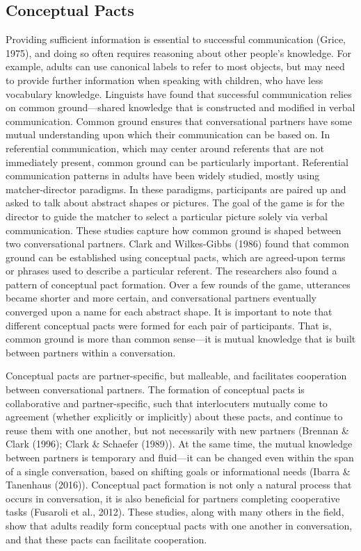 \documentclass[10pt, letterpaper]{article}
\begin{document}
\hypertarget{conceptual-pacts}{%
\subsection{Conceptual Pacts}\label{conceptual-pacts}}

Providing sufficient information is essential to successful
communication (Grice, 1975), and doing so often requires reasoning about
other people's knowledge. For example, adults can use canonical labels
to refer to most objects, but may need to provide further information
when speaking with children, who have less vocabulary knowledge.
Linguists have found that successful communication relies on common
ground---shared knowledge that is constructed and modified in verbal
communication. Common ground ensures that conversational partners have
some mutual understanding upon which their communication can be based
on. In referential communication, which may center around referents that
are not immediately present, common ground can be particularly
important. Referential communication patterns in adults have been widely
studied, mostly using matcher-director paradigms. In these paradigms,
participants are paired up and asked to talk about abstract shapes or
pictures. The goal of the game is for the director to guide the matcher
to select a particular picture solely via verbal communication. These
studies capture how common ground is shaped between two conversational
partners. Clark and Wilkes-Gibbs (1986) found that common ground can be
established using conceptual pacts, which are agreed-upon terms or
phrases used to describe a particular referent. The researchers also
found a pattern of conceptual pact formation. Over a few rounds of the
game, utterances became shorter and more certain, and conversational
partners eventually converged upon a name for each abstract shape. It is
important to note that different conceptual pacts were formed for each
pair of participants. That is, common ground is more than common
sense---it is mutual knowledge that is built between partners within a
conversation.

Conceptual pacts are partner-specific, but malleable, and facilitates
cooperation between conversational partners. The formation of conceptual
pacts is collaborative and partner-specific, such that interlocuters
mutually come to agreement (whether explicitly or implicitly) about
these pacts, and continue to reuse them with one another, but not
necessarily with new partners (Brennan \& Clark (1996); Clark \&
Schaefer (1989)). At the same time, the mutual knowledge between
partners is temporary and fluid---it can be changed even within the span
of a single conversation, based on shifting goals or informational needs
(Ibarra \& Tanenhaus (2016)). Conceptual pact formation is not only a
natural process that occurs in conversation, it is also beneficial for
partners completing cooperative tasks (Fusaroli et al., 2012). These
studies, along with many others in the field, show that adults readily
form conceptual pacts with one another in conversation, and that these
pacts can facilitate cooperation.
\end{document}
